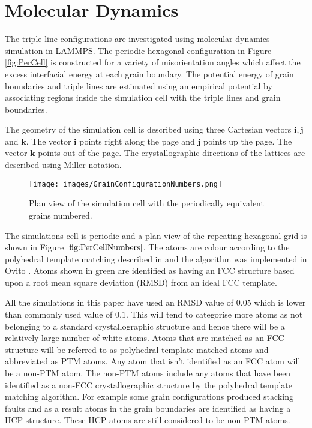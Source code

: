 \documentclass[12pt,a4paper,openany]{report}
\begin{document}
\chapter{Molecular Dynamics} \label{ch:MD}

The triple line configurations are investigated using molecular dynamics simulation in LAMMPS. The periodic hexagonal configuration in Figure \ref{fig:PerCell} is constructed for a variety of misorientation angles which affect the excess interfacial energy at each grain boundary. The potential energy of grain boundaries and triple lines are estimated using an empirical potential by associating regions inside the simulation cell with the triple lines and grain boundaries. 

The geometry of the simulation cell is described using three Cartesian vectors $\mathbf{i}, \mathbf{j}$ and $\mathbf{k}$. The vector $\mathbf{i}$ points right along the page and $\mathbf{j}$  points up the page. The vector $\mathbf{k}$ points out of the page. The crystallographic directions of the lattices are described using Miller notation.

\begin{figure}
	\texttt{[image: images/GrainConfigurationNumbers.png]}
	\caption{Plan view of the simulation cell with the periodically equivalent grains numbered.}
	\label{fig:PerCellNumbers} 
\end{figure}

The simulations cell is periodic and a plan view of the repeating hexagonal grid is shown in Figure $\ref{fig:PerCellNumbers}$. The atoms are colour according to the polyhedral template matching described in \cite{Larsen_2016} and the algorithm  was implemented in Ovito \cite{Stukowski2009}. Atoms shown in green are identified as having an FCC structure based upon a root mean square deviation (RMSD) from an ideal FCC template. 

All the simulations in this paper have used an RMSD value of $0.05$ which is lower than commonly used value of $0.1$. This will tend to categorise more atoms as not belonging to a standard crystallographic structure and hence there will be a relatively large number of white atoms. Atoms that are matched as an FCC structure will be referred to as polyhedral template matched atoms and abbreviated as PTM atoms. Any atom that isn't identified as an FCC atom will be a non-PTM atom. The non-PTM atoms include any atoms that have been identified as a non-FCC crystallographic structure by the polyhedral template matching algorithm. For example some grain configurations produced stacking faults and as a result atoms in the grain boundaries are identified as having a HCP structure. These HCP atoms are still considered to be non-PTM atoms.
 
\end{document}
